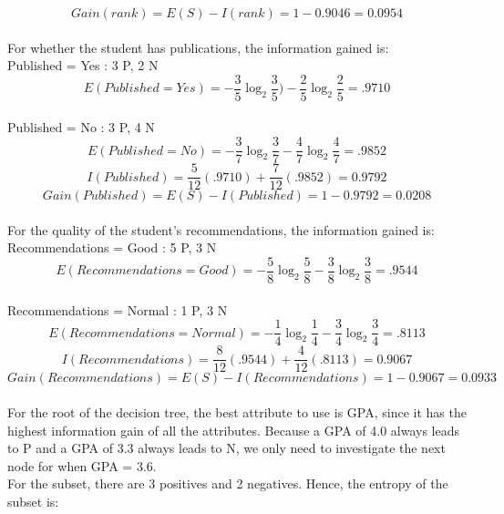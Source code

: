 \documentclass[12pt]{article}
\begin{document}
\begin{equation}
Gain(rank) = E(S) - I(rank) = 1 - 0.9046 = 0.0954
\end{equation}
\\
For whether the student has publications, the information gained is:
\\
Published = Yes : 3 P, 2 N
\begin{equation}
E(Published = Yes) = -\frac{3}{5}\log_2\frac{3}{5}) - \frac{2}{5}\log_2\frac{2}{5} = .9710
\end{equation}
\\
Published = No : 3 P, 4 N
\begin{equation}
E(Published = No) = -\frac{3}{7}\log_2\frac{3}{7} - \frac{4}{7}\log_2\frac{4}{7} = .9852
\end{equation}
\begin{equation}
I(Published) = \frac{5}{12}(.9710)+\frac{7}{12}(.9852) = 0.9792
\end{equation}
\begin{equation}
Gain(Published) = E(S) - I(Published) = 1 - 0.9792 = 0.0208
\end{equation}
\\
For the quality of the student's recommendations, the information gained is:
\\
Recommendations = Good : 5 P, 3 N
\begin{equation}
E(Recommendations = Good) = -\frac{5}{8}\log_2\frac{5}{8}-\frac{3}{8}\log_2\frac{3}{8} = .9544
\end{equation}
\\
Recommendations = Normal : 1 P, 3 N
\begin{equation}
E(Recommendations = Normal) = -\frac{1}{4}\log_2\frac{1}{4}-\frac{3}{4}\log_2\frac{3}{4} = .8113
\end{equation}
\begin{equation}
I(Recommendations) = \frac{8}{12}(.9544)+\frac{4}{12}(.8113) = 0.9067
\end{equation}
\begin{equation}
Gain(Recommendations) = E(S) - I(Recommendations) = 1 - 0.9067 = 0.0933
\end{equation}
\\
For the root of the decision tree, the best attribute to use is GPA, since it has the highest information gain of all the attributes. Because a GPA of 4.0 always leads to P and a GPA of 3.3 always leads to N, we only need to investigate the next node for when GPA = 3.6.
\\
For the subset, there are 3 positives and 2 negatives. Hence, the entropy of the subset is:
\end{document}
